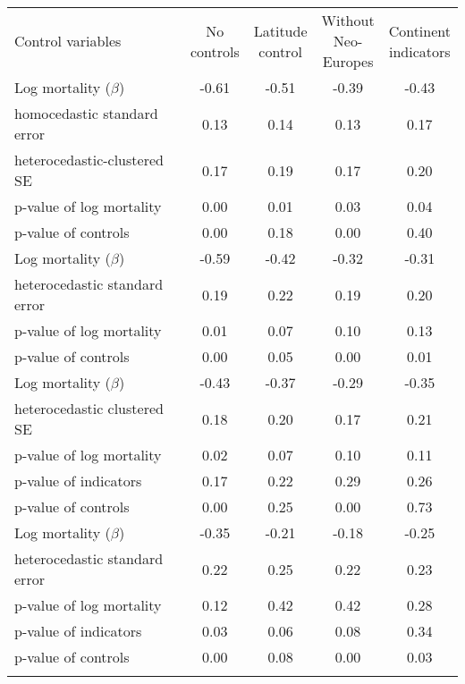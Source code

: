 \begin{center}
\begin{tabular}{lcccc}
\hline \noalign{\smallskip}Control variables & \shortstack{No\\controls} & \shortstack{Latitude\\control} & \shortstack{Without\\Neo-\\Europes} & \shortstack{Continent\\indicators}\\
\noalign{\smallskip}\hline \noalign{\smallskip}Log mortality ($\beta$) & -0.61 & -0.51 & -0.39 & -0.43\\
homocedastic standard error & 0.13 & 0.14 & 0.13 & 0.17\\
heterocedastic-clustered SE & 0.17 & 0.19 & 0.17 & 0.20\\
p-value of log mortality & 0.00 & 0.01 & 0.03 & 0.04\\
p-value of controls & 0.00 & 0.18 & 0.00 & 0.40\\
Log mortality ($\beta$) & -0.59 & -0.42 & -0.32 & -0.31\\
heterocedastic standard error & 0.19 & 0.22 & 0.19 & 0.20\\
p-value of log mortality & 0.01 & 0.07 & 0.10 & 0.13\\
p-value of controls & 0.00 & 0.05 & 0.00 & 0.01\\
Log mortality ($\beta$) & -0.43 & -0.37 & -0.29 & -0.35\\
heterocedastic clustered SE & 0.18 & 0.20 & 0.17 & 0.21\\
p-value of log mortality & 0.02 & 0.07 & 0.10 & 0.11\\
p-value of indicators & 0.17 & 0.22 & 0.29 & 0.26\\
p-value of controls & 0.00 & 0.25 & 0.00 & 0.73\\
Log mortality ($\beta$) & -0.35 & -0.21 & -0.18 & -0.25\\
heterocedastic standard error & 0.22 & 0.25 & 0.22 & 0.23\\
p-value of log mortality & 0.12 & 0.42 & 0.42 & 0.28\\
p-value of indicators & 0.03 & 0.06 & 0.08 & 0.34\\
p-value of controls & 0.00 & 0.08 & 0.00 & 0.03\\
\noalign{\smallskip}\hline\end{tabular}\\
\end{center}
